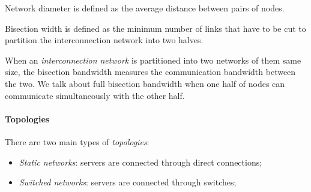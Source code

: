 \begin{definition}
    Network diameter is defined as the average distance between pairs of
    nodes.
\end{definition}
\begin{definition}
    Bisection width is defined as the minimum number of links that have to be
    cut to partition the interconnection network into two halves.
\end{definition}

\noindent
When an \emph{interconnection network} is partitioned into two networks of
them same size, the bisection bandwidth measures the communication bandwidth
between the two. We talk about full bisection bandwidth when one half of nodes
can communicate simultaneously with the other half.

\paragraph{Topologies}
There are two main types of \emph{topologies}:
\begin{itemize}
    \item \emph{Static networks}: servers are connected through direct connections;
    \item \emph{Switched networks}: servers are connected through switches;
\end{itemize}

